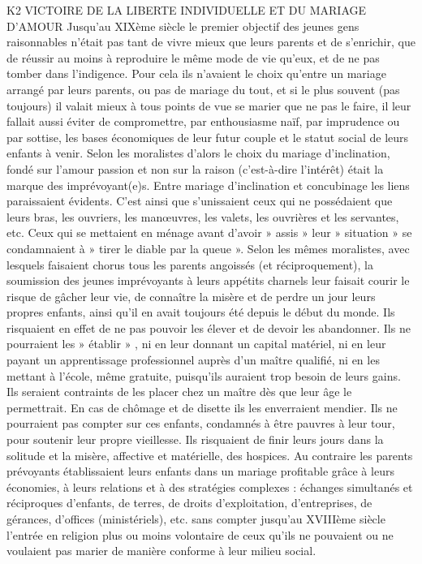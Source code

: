 K2 VICTOIRE DE LA LIBERTE INDIVIDUELLE ET DU MARIAGE D'AMOUR
 Jusqu'au XIXème siècle le premier objectif des jeunes gens raisonnables n'était pas tant de vivre mieux que leurs parents et de s'enrichir, que de réussir au moins à reproduire le même mode de vie qu'eux, et de ne pas tomber dans l'indigence. Pour cela ils n'avaient le choix qu'entre un mariage arrangé par leurs parents, ou pas de mariage du tout, et si le plus souvent (pas toujours) il valait mieux à tous points de vue se marier que ne pas le faire, il leur fallait aussi éviter de compromettre, par enthousiasme naïf, par imprudence ou par sottise, les bases économiques de leur futur couple et le statut social de leurs enfants à venir. 
 Selon les moralistes d'alors le choix du mariage d'inclination, fondé sur l'amour passion et non sur la raison (c'est-à-dire l'intérêt) était la marque des imprévoyant(e)s. Entre mariage d'inclination et concubinage les liens paraissaient évidents. C'est ainsi que s'unissaient ceux qui ne possédaient que leurs bras, les ouvriers, les manœuvres, les valets, les ouvrières et les servantes, etc. Ceux qui se mettaient en ménage avant d'avoir » assis » leur » situation » se condamnaient à » tirer le diable par la queue ». Selon les mêmes moralistes, avec lesquels faisaient chorus tous les parents angoissés (et réciproquement), la soumission des jeunes imprévoyants à leurs appétits charnels leur faisait courir le risque de gâcher leur vie, de connaître la misère et de perdre un jour leurs propres enfants, ainsi qu'il en avait toujours été depuis le début du monde. 
 Ils risquaient en effet de ne pas pouvoir les élever et de devoir les abandonner. Ils ne pourraient les » établir » , ni en leur donnant un capital matériel, ni en leur payant un apprentissage professionnel auprès d'un maître qualifié, ni en les mettant à l'école, même gratuite, puisqu'ils auraient trop besoin de leurs gains. Ils seraient contraints de les placer chez un maître dès que leur âge le permettrait. En cas de chômage et de disette ils les enverraient mendier. Ils ne pourraient pas compter sur ces enfants, condamnés à être pauvres à leur tour, pour soutenir leur propre vieillesse. Ils risquaient de finir leurs jours dans la solitude et la misère, affective et matérielle, des hospices.
 Au contraire les parents prévoyants établissaient leurs enfants dans un mariage profitable grâce à leurs économies, à leurs relations et à des stratégies complexes : échanges simultanés et réciproques d'enfants, de terres, de droits d'exploitation, d'entreprises, de gérances, d'offices (ministériels), etc. sans compter jusqu'au XVIIIème siècle l'entrée en religion plus ou moins volontaire de ceux qu'ils ne pouvaient ou ne voulaient pas marier de manière conforme à leur milieu social. 
